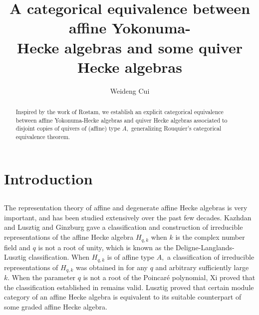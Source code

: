 \documentclass[11pt, reqno]{amsart} \textwidth=14.9cm \oddsidemargin=1cm \evensidemargin=1cm
\theoremstyle{definition}
\numberwithin{equation}{section}
\begin{document}
\title[A categorical equivalence]{A categorical equivalence between affine Yokonuma-\\Hecke algebras and some quiver Hecke algebras}
\author[Weideng Cui]{Weideng Cui}
\address{School of Mathematics, Shandong University, Jinan, Shandong 250100, P.R. China.}

\begin{abstract}
Inspired by the work of Rostam, we establish an explicit categorical equivalence between affine Yokonuma-Hecke algebras and quiver Hecke algebras associated to disjoint copies of quivers of (affine) type $A,$ generalizing Rouquier's categorical equivalence theorem.
\end{abstract}




\maketitle
\medskip
\section{Introduction}
\subsection{}
The representation theory of affine and degenerate affine Hecke algebras is very important, and has been studied extensively over the past few decades. Kazhdan and Lusztig \cite{KaLu} and Ginzburg \cite{CG} gave a classification and construction of irreducible representations of the affine Hecke algebra $H_{q,k}$ when $k$ is the complex number field and $q$ is not a root of unity, which is known as the Deligne-Langlands-Lusztig classification. When $H_{q,k}$ is of affine type $A,$ a classification of irreducible representations of $H_{q,k}$ was obtained in \cite{AM} for any $q$ and arbitrary sufficiently large $k.$ When the parameter $q$ is not a root of the Poincar\'{e} polynomial, Xi \cite{Xi} proved that the classification established in \cite{KaLu} remains valid. Lusztig \cite{Lu1} proved that certain module category of an affine Hecke algebra is equivalent to its suitable counterpart of some graded affine Hecke algebra.
\end{document}
